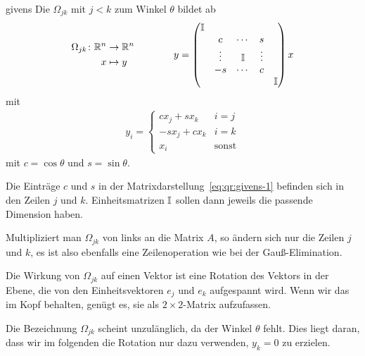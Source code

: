 \begin{Definition}{givens}
  Die  $\Omega_{jk}$ mit $j<k$ zum Winkel $\theta$ bildet ab
  \begin{gather}
    \label{eq:qr:givens-1}
    \begin{aligned}
      \Omega_{jk}\colon \mathbb R^n &\to \mathbb R^n\\
      x & \mapsto y      
    \end{aligned}
    \qquad\qquad
    y =
    \begin{pmatrix}
      \mathbb I \\
      &c&\cdots&s\\
      &\vdots&\mathbb I &\vdots\\
      &-s&\cdots&c\\
      &&&&\mathbb I
    \end{pmatrix}
    x
  \end{gather}
  mit
  \begin{gather}
    y_i =
    \begin{cases}
      c x_j + s x_k & i=j\\
      -s x_j + c x_k & i=k\\
      x_i &\text{sonst}
    \end{cases}
  \end{gather}
  mit $c = \cos\theta$ und $s = \sin\theta$.
\end{Definition}

\begin{remark}
  Die Einträge $c$ und $s$ in der
  Matrixdarstellung~\eqref{eq:qr:givens-1} befinden sich in den Zeilen
  $j$ und $k$. Einheitsmatrizen $\mathbb I$ sollen dann jeweils die passende
  Dimension haben.

  Multipliziert man $\Omega_{jk}$ von links an die Matrix $A$, so
  ändern sich nur die Zeilen $j$ und $k$, es ist also ebenfalls eine
  Zeilenoperation wie bei der Gauß-Elimination.

  Die Wirkung von $\Omega_{jk}$ auf einen Vektor ist eine Rotation des
  Vektors in der Ebene, die von den Einheitsvektoren $e_j$ und $e_k$
  aufgespannt wird. Wenn wir das im Kopf behalten, genügt es, sie als
  $2\times2$-Matrix aufzufassen.

  Die Bezeichnung $\Omega_{jk}$ scheint unzulänglich, da der Winkel
  $\theta$ fehlt. Dies liegt daran, dass wir im folgenden die Rotation
  nur dazu verwenden, $y_k=0$ zu erzielen.
\end{remark}

